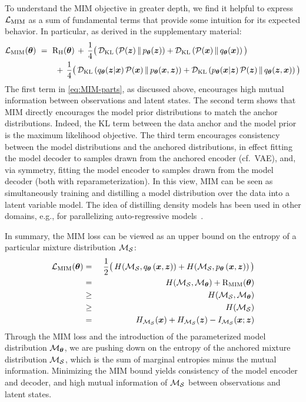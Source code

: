 To understand the MIM objective in greater depth, we find it helpful to express $\mathcal{L}_\text{MIM}$ 
as a sum of fundamental terms that provide some intuition for its expected behavior.  
In particular, as derived in the supplementary material:
\begin{align}
    \mathcal{L}_\text{MIM}({\boldsymbol \theta})~ &=  ~
    \mathrm{R}_\mathrm{H}({\boldsymbol \theta}) \, +\,
    \frac{1}{4}\big(\, \mathcal{D}_\text{KL}\left(\mathcal{P}({\boldsymbol z})\,\|\,  p_{{\boldsymbol \theta}}({\boldsymbol z})\right)  + \mathcal{D}_\text{KL}\left(\mathcal{P}({\boldsymbol{x}})\,\|\, q_{{\boldsymbol \theta}}({\boldsymbol{x}})\right) \big)
    \nonumber \\
    & \qquad
    +\, \frac{1}{4}\big(\,\mathcal{D}_\text{KL}\left(q_{{\boldsymbol \theta}}({\boldsymbol z} | {\boldsymbol{x}})\, \mathcal{P}({\boldsymbol{x}}) \,\|\,  p_{{\boldsymbol \theta}}({\boldsymbol{x}}, {\boldsymbol z})\right) + \mathcal{D}_\text{KL}\left(p_{{\boldsymbol \theta}}({\boldsymbol{x}} | {\boldsymbol z})\, \mathcal{P}({\boldsymbol z})\,\|\,  q_{{\boldsymbol \theta}}({\boldsymbol z} , {\boldsymbol{x}})\right) \big)
    \label{eq:MIM-parts}
\end{align}
The first term in \eqref{eq:MIM-parts}, as discussed above, encourages high mutual
information between observations and latent states. The second term shows that MIM
directly encourages the model prior distributions to match the anchor distributions.
Indeed, the KL term between the data anchor and the model prior is the maximum
likelihood objective.
The third term encourages consistency between the model distributions and the
anchored distributions, in effect fitting the model decoder to samples drawn from
the anchored encoder (cf.\ VAE), and, via symmetry, fitting the model encoder to
samples drawn from the model decoder (both with reparameterization).
In this view, MIM can be seen as simultaneously training and distilling a model
distribution over the data into a latent variable model.
The idea of distilling density models has been used in other domains, e.g.,
for parallelizing auto-regressive models~\citep{oord2017parallel}.


In summary, the MIM loss can be viewed as an upper bound on the entropy
of a particular mixture distribution $\mathcal{M}_{\mathcal{S}}$:
\begin{eqnarray}
    \mathcal{L}_\text{MIM}({\boldsymbol \theta}) &=& 
    ~\frac{1}{2} \big(\, H(\mathcal{M}_{\mathcal{S}}, q_{{\boldsymbol \theta}} \left({\boldsymbol{x}}, {\boldsymbol z} \right) ) + 
    H(\mathcal{M}_{\mathcal{S}}, p_{{\boldsymbol \theta}} \left({\boldsymbol{x}}, {\boldsymbol z} \right)) \, \big) \nonumber \\
    &=& H(\mathcal{M}_{\mathcal{S}}, \mathcal{M}_{{\boldsymbol \theta}}) + \mathrm{R}_{\mathrm{MIM}}({\boldsymbol \theta}) \nonumber  \\
    &\geq& H(\mathcal{M}_{\mathcal{S}}, \mathcal{M}_{{\boldsymbol \theta}}) \nonumber \\
    &\geq& H(\mathcal{M}_{\mathcal{S}}) \nonumber  \\
    &=&  H_{\mathcal{M}_{\mathcal{S}}} ({\boldsymbol{x}}) + H_{\mathcal{M}_{\mathcal{S}}} ({\boldsymbol z}) - I_{\mathcal{M}_{\mathcal{S}}} ({\boldsymbol{x}};{\boldsymbol z}) 
    \label{eq:MIM-symmetric-bound}
\end{eqnarray}
Through the MIM loss and the introduction of the parameterized model
distribution $\mathcal{M}_{{\boldsymbol \theta}}$, we are pushing down on the entropy of the anchored
mixture distribution $\mathcal{M}_{\mathcal{S}}$, which is the sum of marginal entropies minus 
the mutual information.  Minimizing the MIM bound yields consistency of the 
model encoder and decoder, and high mutual information of $\mathcal{M}_{\mathcal{S}}$ between 
observations and latent states.


